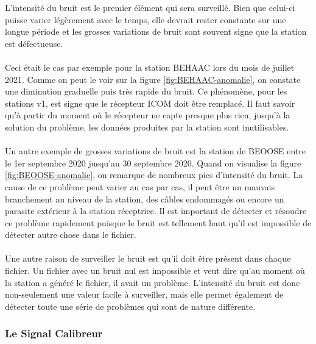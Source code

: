 \documentclass[11pt]{article}
\begin{document}
L'intensité du bruit est le premier élément qui sera surveillé.
Bien que celui-ci puisse varier légèrement avec le temps, elle devrait rester constante sur une longue période et les grosses variations de bruit sont souvent signe que la station est défectueuse.\\
\\
Ceci était le cas par exemple pour la station BEHAAC lors du mois de juillet 2021.
Comme on peut le voir sur la figure \ref{fig:BEHAAC-anomalie}, on constate une diminution graduelle puis très rapide du bruit.
Ce phénomène, pour les stations v1, est signe que le récepteur ICOM doit être remplacé.
Il faut savoir qu'à partir du moment où le récepteur ne capte presque plus rien, jusqu'à la solution du problème, les données produites par la station sont inutilisables.\\
\\
Un autre exemple de grosses variations de bruit est la station de BEOOSE entre le 1er septembre 2020 jusqu'au 30 septembre 2020.
Quand on visualise la figure \ref{fig:BEOOSE-anomalie}, on remarque de nombreux pics d'intensité du bruit.
La cause de ce problème peut varier au cas par cas, il peut être un mauvais branchement au niveau de la station, des câbles endommagés ou encore un parasite extérieur à la station réceptrice.
Il est important de détecter et résoudre ce problème rapidement puisque le bruit est tellement haut qu'il est impossible de détecter autre chose dans le fichier.\\
\\
Une autre raison de surveiller le bruit est qu'il doit être présent dans chaque fichier.
Un fichier avec un bruit nul est impossible et veut dire qu'au moment où la station a généré le fichier, il avait un problème.
L'intensité du bruit est donc non-seulement une valeur facile à surveiller, mais elle permet également de détecter toute une série de problèmes qui sont de nature différente.

\subsubsection{Le Signal Calibreur}
\end{document}
